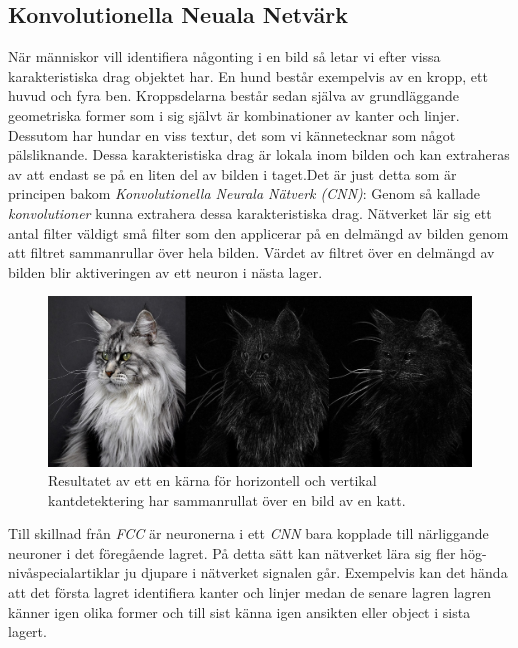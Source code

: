 \documentclass[a4paper,11pt,twoside]{article}
\begin{document}
\subsection{Konvolutionella Neuala Netvärk}
När människor vill identifiera någonting i en bild så letar vi efter vissa karakteristiska drag objektet har. En hund består exempelvis av en kropp, ett huvud och fyra ben. Kroppsdelarna består sedan själva av grundläggande geometriska former som i sig självt är kombinationer av kanter och linjer. Dessutom har hundar en viss textur, det som vi kännetecknar som något pälsliknande. Dessa karakteristiska drag är lokala inom bilden och kan extraheras av att endast se på en liten del av bilden i taget.Det är just detta som är principen bakom \textit{Konvolutionella Neurala Nätverk (CNN)}: Genom så kallade \textit{konvolutioner} kunna extrahera dessa karakteristiska drag. Nätverket lär sig ett antal filter väldigt små filter som den applicerar på en delmängd av bilden genom att filtret sammanrullar över hela bilden. Värdet av filtret över en delmängd av bilden blir aktiveringen av ett neuron i nästa lager.  \cite{cs231n}

\begin{figure}[h]\label{figkatter}
	\centering
  		\includegraphics[scale=0.33]{katter.png}
  	\caption{Resultatet av ett en kärna för horizontell och vertikal kantdetektering har sammanrullat över en bild av en katt.}
\end{figure}

Till skillnad från \textit{FCC} är neuronerna i ett \textit{CNN} bara kopplade till närliggande neuroner i det föregående lagret. På detta sätt kan nätverket lära sig fler hög-nivåspecialartiklar ju djupare i nätverket signalen går. Exempelvis kan det hända att det första lagret identifiera kanter och linjer medan de senare lagren lagren känner igen olika former och till sist känna igen ansikten eller object i sista lagert. \cite{cs231n}
\end{document}
